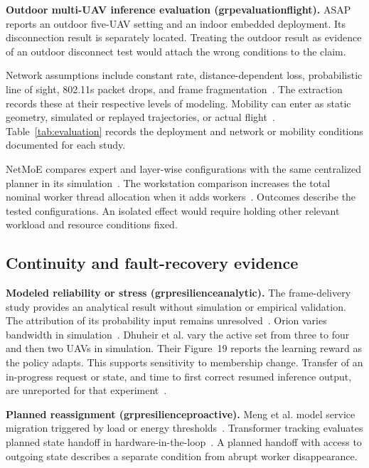 \documentclass[pdflatex,sn-vancouver-num]{sn-jnl}
\newcommand{\groupcite}[2]{\csname grp#1#2\endcsname}
\begin{document}
\textbf{Outdoor multi-UAV inference evaluation (\groupcite{evaluation}{flight}).}
ASAP reports an outdoor five-UAV setting and an indoor embedded deployment. Its disconnection result is separately located. Treating the outdoor result as evidence of an outdoor disconnect test would attach the wrong conditions to the claim.

Network assumptions include constant rate, distance-dependent loss, probabilistic line of sight, 802.11s packet drops, and frame fragmentation~\cite{R0015,R0022,R0073,R0083,R0121}. The extraction records these at their respective levels of modeling. Mobility can enter as static geometry, simulated or replayed trajectories, or actual flight~\cite{R0003,R0014,R0074}. Table~\ref{tab:evaluation} records the deployment and network or mobility conditions documented for each study.

NetMoE compares expert and layer-wise configurations with the same centralized planner in its simulation~\cite{R0118}. The workstation comparison increases the total nominal worker thread allocation when it adds workers~\cite{R0125}. Outcomes describe the tested configurations. An isolated effect would require holding other relevant workload and resource conditions fixed.

\subsection{Continuity and fault-recovery evidence}
\textbf{Modeled reliability or stress (\groupcite{resilience}{analytic}).}
The frame-delivery study provides an analytical result without simulation or empirical validation. The attribution of its probability input remains unresolved~\cite{R0121}. Orion varies bandwidth in simulation~\cite{R0074}. Dhuheir et al. vary the active set from three to four and then two UAVs in simulation. Their Figure~19 reports the learning reward as the policy adapts. This supports sensitivity to membership change. Transfer of an in-progress request or state, and time to first correct resumed inference output, are unreported for that experiment~\cite{R0019}.

\textbf{Planned reassignment (\groupcite{resilience}{proactive}).}
Meng et al. model service migration triggered by load or energy thresholds~\cite{R0045}. Transformer tracking evaluates planned state handoff in hardware-in-the-loop~\cite{R0292}. A planned handoff with access to outgoing state describes a separate condition from abrupt worker disappearance.
\end{document}
